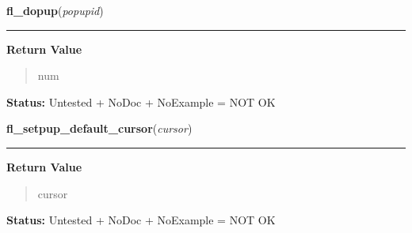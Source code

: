     \vspace{0.5ex}

\hspace{.8\funcindent}\begin{boxedminipage}{\funcwidth}

    \raggedright \textbf{fl\_dopup}(\textit{popupid})

    \vspace{-1.5ex}

    \rule{\textwidth}{0.5\fboxrule}
\setlength{\parskip}{2ex}
\setlength{\parskip}{1ex}
      \textbf{Return Value}
    \vspace{-1ex}

      \begin{quote}
      num

      \end{quote}

\textbf{Status:} Untested + NoDoc + NoExample = NOT OK



    \end{boxedminipage}

    \label{xformslib:library:fl_setpup_default_cursor}

    \vspace{0.5ex}

\hspace{.8\funcindent}\begin{boxedminipage}{\funcwidth}

    \raggedright \textbf{fl\_setpup\_default\_cursor}(\textit{cursor})

    \vspace{-1.5ex}

    \rule{\textwidth}{0.5\fboxrule}
\setlength{\parskip}{2ex}
\setlength{\parskip}{1ex}
      \textbf{Return Value}
    \vspace{-1ex}

      \begin{quote}
      cursor

      \end{quote}

\textbf{Status:} Untested + NoDoc + NoExample = NOT OK



    \end{boxedminipage}

    \label{xformslib:library:fl_setpup_default_color}

